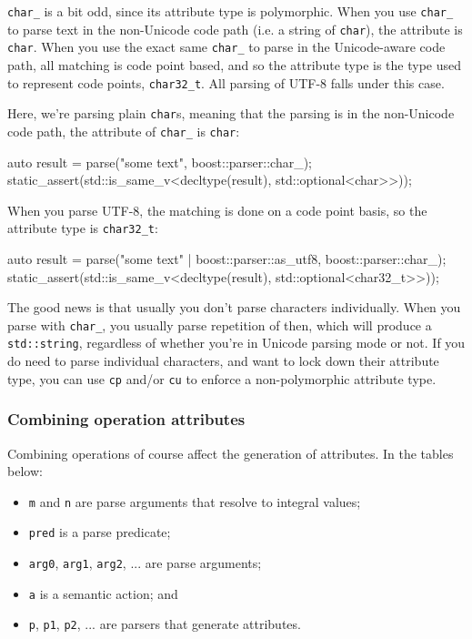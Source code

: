 \hfill\break

\texttt{char\_} is a bit odd, since its attribute type is polymorphic. When you use \texttt{char\_} to parse text in the non-Unicode code path (i.e. a string of \texttt{char}), the attribute is \texttt{char}. When you use the exact same \texttt{char\_} to parse in the Unicode-aware code path, all matching is code point based, and so the attribute type is the type used to represent code points, \texttt{char32\_t}. All parsing of UTF-8 falls under this case.

Here, we're parsing plain \texttt{char}s, meaning that the parsing is in the non-Unicode code path, the attribute of \texttt{char\_} is \texttt{char}:

\begin{code}
auto result = parse("some text", boost::parser::char_);
static_assert(std::is_same_v<decltype(result), std::optional<char>>));
\end{code}

When you parse UTF-8, the matching is done on a code point basis, so the attribute type is \texttt{char32\_t}:

\begin{code}
auto result = parse("some text" | boost::parser::as_utf8, boost::parser::char_);
static_assert(std::is_same_v<decltype(result), std::optional<char32_t>>));
\end{code}

The good news is that usually you don't parse characters individually. When you parse with \texttt{char\_}, you usually parse repetition of then, which will produce a \texttt{std::string}, regardless of whether you're in Unicode parsing mode or not. If you do need to parse individual characters, and want to lock down their attribute type, you can use \texttt{cp} and/or \texttt{cu} to enforce a non-polymorphic attribute type.

\subsubsection{Combining operation attributes}

Combining operations of course affect the generation of attributes. In the tables below:

\begin{itemize}
\item
  \texttt{m} and \texttt{n} are parse arguments that resolve to integral values;
\item
  \texttt{pred} is a parse predicate;
\item
  \texttt{arg0}, \texttt{arg1}, \texttt{arg2}, ... are parse arguments;
\item
  \texttt{a} is a semantic action; and
\item
  \texttt{p}, \texttt{p1}, \texttt{p2}, ... are parsers that generate attributes.
\end{itemize}

